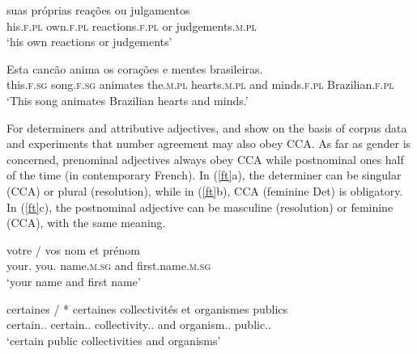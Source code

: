\documentclass[output=paper
                ,modfonts
                ,nonflat
	        ,collection
	        ,collectionchapter
	        ,collectiontoclongg
 	        ,biblatex
                ,babelshorthands
                ,newtxmath
                ,draftmode
                ,colorlinks, citecolor=brown
]{./langsci/langscibook}
\begin{document}
{\begin{exe}
 \ex
\begin{xlista}
\ex \gll suas pr\'{o}prias rea\c{c}\~{o}es ou julgamentos \\
his.\textsc{f.pl} own.\textsc{f.pl} reactions.\textsc{f.pl} or judgements.\textsc{m.pl} \\
\glt `his own reactions or judgements' \citep[435]{Villavicencio:Sadler:ea:05}  


\ex \gll Esta canc\~{a}o anima os cora\c{c}\~{o}es e mentes brasileiras. \\
 this.\textsc{f.sg}  song.\textsc{f.sg} animates the.\textsc{m.pl} hearts.\textsc{m.pl} and minds.\textsc{f.pl} Brazilian.\textsc{f.pl} \\
\glt `This song animates Brazilian hearts and minds.' \citep[437]{Villavicencio:Sadler:ea:05} 
\end{xlista} \label{fo}
\end{exe}

For  determiners and attributive adjectives, \citet{An:Abeille:17} and \citet{Abeille:An:Shiraishi:18} show on the basis of corpus data and experiments that number agreement may also obey CCA. As far as gender is concerned, prenominal adjectives always obey CCA while postnominal ones half of the time (in contemporary French). In (\ref{ft}a), the determiner can be singular (CCA) or plural (resolution), while in (\ref{ft}b), CCA (feminine Det) is obligatory. In (\ref{ft}c), the postnominal adjective can be masculine (resolution) or feminine (CCA), with the same meaning.

\begin{exe}
 \ex
\begin{xlista}
\ex  
\gll votre / vos nom et pr\'{e}nom \\
     your.\sg{} {} you.\pl{} name.\textsc{m.sg} and first.name.\textsc{m.sg} \\
\glt `your name and first name' \citep[]{An:Abeille:17}

\ex 
\gll certaines          / *   certaines collectivités et organismes publics \\
     certain.\fem.\pl{} {} {} certain.\fem.\pl{} collectivity.\fem.\pl{} and organism.\mas.\pl{} public.\mas.\pl{} \\
\glt `certain public collectivities and organisms' \citep[]{Abeille:An:Shiraishi:18}


\end{xlista}
\end{exe}}
\end{document}
